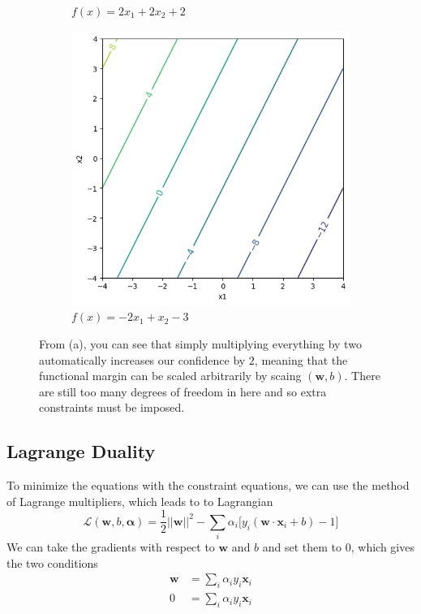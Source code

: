 \documentclass{article}
\theoremstyle{definition}
\begin{document}
\begin{figure}[hbt!]
\begin{subfigure}[b]{0.32\textwidth}
          \caption{$f(x) = 2 x_1 + 2 x_2 + 2$} 
          \label{fig:two_times_scaled}
      \end{subfigure} 
      \hfill
      \begin{subfigure}[b]{0.32\textwidth} 
          \centering 
          \includegraphics[width=\textwidth]{img/scaling3.png} 
          \caption{$f(x) = -2x_1 + x_2 - 3$} 
          \label{fig:something_else}
      \end{subfigure} 

      \caption{From (a), you can see that simply multiplying everything by two automatically increases our confidence by $2$, meaning that the functional margin can be scaled arbitrarily by scaing $(\mathbf{w}, b)$. There are still too many degrees of freedom in here and so extra constraints must be imposed. } 
      \label{fig:scaling_problem} 
  \end{figure}


  \subsection{Lagrange Duality} 

  To minimize the equations with the constraint equations, we can use the method of Lagrange multipliers, which leads to to Lagrangian 
  \[\mathcal{L}(\mathbf{w}, b, \boldsymbol{\alpha}) = \frac{1}{2} ||\mathbf{w}||^2 - \sum_i \alpha_i \big[ y_i (\mathbf{w} \cdot \mathbf{x}_i + b) - 1\big]\]
  We can take the gradients with respect to $\mathbf{w}$ and $b$ and set them to $0$, which gives the two conditions 
  \begin{align*} 
    \mathbf{w} & = \sum_i \alpha_i y_i \mathbf{x}_i \\
    0 & = \sum_i \alpha_i y_i \mathbf{x}_i 
  \end{align*}
\end{document}
